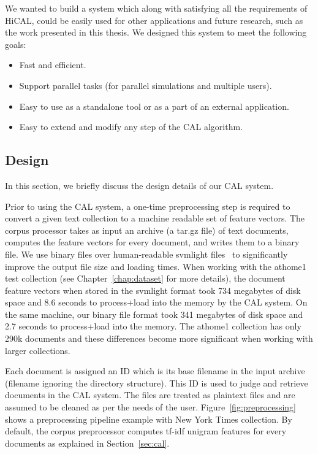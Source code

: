We wanted to build a system which along with satisfying all the requirements of
HiCAL, could be easily used for other applications and future research, such as
the work presented in this thesis. We designed this system to meet the following
goals:

\begin{itemize}
\item Fast and efficient.
\item Support parallel tasks (for parallel simulations and multiple users).
\item Easy to use as a standalone tool or as a part of an external application.
\item Easy to extend and modify any step of the CAL algorithm.
\end{itemize}

\subsection{Design}
\label{sec:cal.design}
In this section, we briefly discuss the design details of our CAL system.

Prior to using the CAL system, a one-time preprocessing step is required to convert a
given text collection to a machine readable set of feature vectors. The corpus
processor takes as input an archive (a tar.gz file) of text documents, computes
the feature vectors for every document, and writes them to a binary file. We use
binary files over human-readable svmlight files~\cite{joachims1999svmlight} to
significantly improve the output file size and loading times. When working with
the athome1 test collection (see Chapter~\ref{chap:dataset} for more details),
the document feature vectors when stored in the svmlight format took 734
megabytes of disk space and 8.6 seconds to process+load into the memory by
the CAL system. On the same machine, our binary file format took 341 megabytes
of disk space and 2.7 seconds to process+load into the memory. The athome1
collection has only 290k documents and these differences become more significant
when working with larger collections.

Each document is assigned an ID which is its base
filename in the input archive (filename ignoring the directory structure). This
ID is used to judge and retrieve documents in the CAL system. The files are
treated as plaintext files and are assumed to be cleaned as per the needs of the
user.  Figure~\ref{fig:preprocessing} shows a preprocessing pipeline example
with New York Times collection.  By default, the corpus preprocessor computes
tf-idf unigram features for every documents as explained in Section~\ref{sec:cal}.

